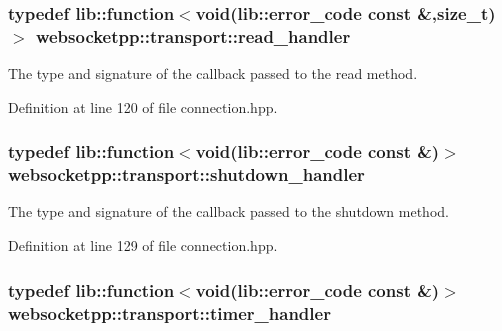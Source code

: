 \hypertarget{namespacewebsocketpp_1_1transport_a3a9b2ed54dfcc6ebe7d7e6b4c02f53fb}{}
\subsubsection[{read\+\_\+handler}]{\setlength{\rightskip}{0pt plus 5cm}typedef lib\+::function$<$void(lib\+::error\+\_\+code const \&,size\+\_\+t)$>$ {\bf websocketpp\+::transport\+::read\+\_\+handler}}\label{namespacewebsocketpp_1_1transport_a3a9b2ed54dfcc6ebe7d7e6b4c02f53fb}


The type and signature of the callback passed to the read method. 



Definition at line 120 of file connection.\+hpp.

\hypertarget{namespacewebsocketpp_1_1transport_af39aff6fc4cb76f7df0d5322b734d156}{}
\subsubsection[{shutdown\+\_\+handler}]{\setlength{\rightskip}{0pt plus 5cm}typedef lib\+::function$<$void(lib\+::error\+\_\+code const \&)$>$ {\bf websocketpp\+::transport\+::shutdown\+\_\+handler}}\label{namespacewebsocketpp_1_1transport_af39aff6fc4cb76f7df0d5322b734d156}


The type and signature of the callback passed to the shutdown method. 



Definition at line 129 of file connection.\+hpp.

\hypertarget{namespacewebsocketpp_1_1transport_a946cc56ff41139f3002149c15fd87bc9}{}
\subsubsection[{timer\+\_\+handler}]{\setlength{\rightskip}{0pt plus 5cm}typedef lib\+::function$<$void(lib\+::error\+\_\+code const \&)$>$ {\bf websocketpp\+::transport\+::timer\+\_\+handler}}\label{namespacewebsocketpp_1_1transport_a946cc56ff41139f3002149c15fd87bc9}


